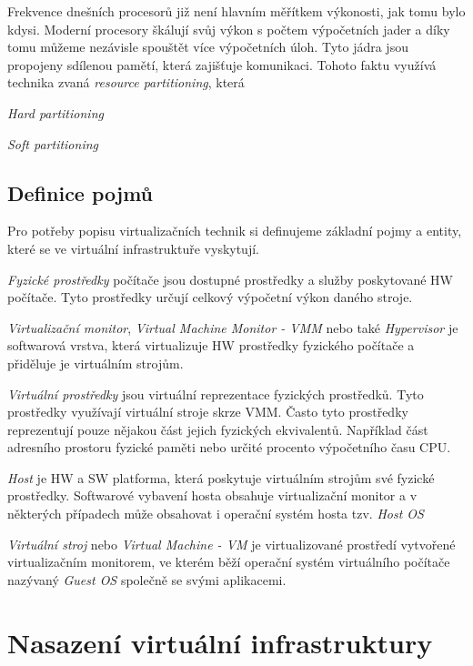     Frekvence dnešních procesorů již není hlavním měřítkem výkonosti, jak tomu bylo kdysi. Moderní procesory škálují svůj výkon s počtem výpočetních jader a díky tomu můžeme nezávisle spouštět více výpočetních úloh.
    Tyto jádra jsou propojeny sdílenou pamětí, která zajišťuje  komunikaci. Tohoto faktu využívá technika zvaná \textit{resource partitioning}, která 
    
    \textit{Hard partitioning}
    
    \textit{Soft partitioning}
  
  
  \subsection{Definice pojmů}
  \label{definitions}

  Pro potřeby popisu virtualizačních technik si definujeme základní pojmy a entity, které se ve virtuální infrastruktuře vyskytují.

  \textit{Fyzické prostředky} počítače jsou dostupné prostředky a služby poskytované HW počítače. Tyto prostředky určují celkový výpočetní výkon daného stroje.

  \textit{Virtualizační monitor}, \textit{Virtual Machine Monitor - VMM} nebo také \textit{Hypervisor} je softwarová vrstva, která virtualizuje HW prostředky fyzického počítače a přiděluje je
  virtuálním strojům.

  \textit{Virtuální prostředky} jsou virtuální reprezentace fyzických prostředků. Tyto prostředky využívají virtuální stroje skrze VMM. Často tyto prostředky reprezentují pouze nějakou část jejich
  fyzických ekvivalentů. Například část adresního prostoru fyzické paměti nebo určité procento výpočetního času CPU.

  \textit{Host} je HW a SW platforma, která poskytuje virtuálním strojům své fyzické prostředky. Softwarové vybavení hosta obsahuje virtualizační
  monitor a v některých případech může obsahovat i operační systém hosta tzv. \textit{Host OS}

  \textit{Virtuální stroj} nebo \textit{Virtual Machine - VM} je virtualizované prostředí vytvořené virtualizačním monitorem, ve kterém běží operační systém virtuálního počítače nazývaný \textit{Guest OS} společně
  se svými aplikacemi.


\section{Nasazení virtuální infrastruktury}
\label{section:vm_deployment}

